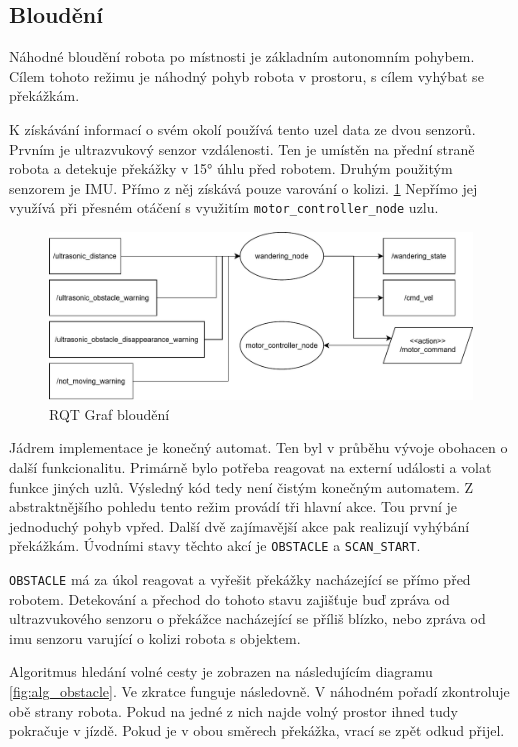 \subsection*{Bloudění}
Náhodné bloudění robota po místnosti je základním autonomním pohybem. Cílem tohoto režimu je náhodný pohyb robota v prostoru, s cílem vyhýbat se překážkám.

K získávání informací o svém okolí používá tento uzel data ze dvou senzorů. Prvním je ultrazvukový senzor vzdálenosti. Ten je umístěn na přední straně robota a detekuje překážky v 15° úhlu před robotem. Druhým použitým senzorem je IMU. Přímo z něj získává pouze varování o kolizi. \ref{fig:rqt_wandering}  Nepřímo jej využívá při přesném otáčení s využitím  \verb|motor_controller_node| uzlu.

\begin{figure}[h!]
	\centering
	\includegraphics[scale=0.75]{obrazky-figures/wandering_rqt.pdf}
	\caption{RQT Graf bloudění}
	\label{fig:rqt_wandering}
\end{figure}

Jádrem implementace je konečný automat. Ten byl v průběhu vývoje obohacen o další funkcionalitu. Primárně bylo potřeba reagovat na externí události a volat funkce jiných uzlů. Výsledný kód tedy není čistým konečným automatem. Z abstraktnějšího pohledu tento režim provádí tři hlavní akce. Tou první je jednoduchý pohyb vpřed. Další dvě zajímavější akce pak realizují vyhýbání překážkám. Úvodními stavy těchto akcí je \verb|OBSTACLE| a \verb|SCAN_START|.

\verb|OBSTACLE| má za úkol reagovat a vyřešit překážky nacházející se přímo před robotem. Detekování a přechod do tohoto stavu zajišťuje buď zpráva od ultrazvukového senzoru o překážce nacházející se příliš blízko, nebo zpráva od imu senzoru varující o kolizi robota s objektem.

Algoritmus hledání volné cesty je zobrazen na následujícím diagramu \ref{fig:alg_obstacle}. Ve zkratce funguje následovně. V náhodném pořadí zkontroluje obě strany robota. Pokud na jedné z nich najde volný prostor ihned tudy pokračuje v jízdě. Pokud je v obou směrech překážka, vrací se zpět odkud přijel.

